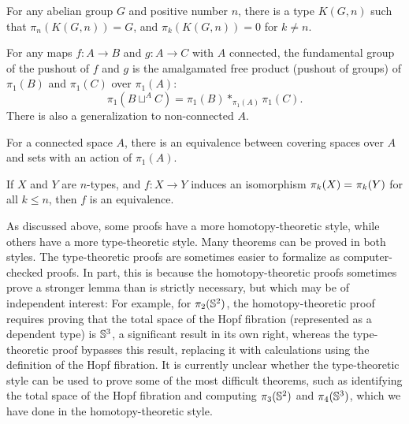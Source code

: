 \begin{thm}\label{Eilenberg-Mac-Lane-Spaces}
For any abelian group $G$ and positive number $n$, there is a type
$K(G,n)$ such that $\pi_n(K(G,n)) = G$, and  $\pi_k(K(G,n)) = 0$
for $k\neq n$.
\end{thm}

\begin{thm}\label{van-Kampen}
For any maps $f:A\to B$ and $g:A\to C$ with $A$ connected, the fundamental group of the pushout of $f$ and $g$ is the amalgamated free product (pushout of groups) of $\pi_1(B)$ and $\pi_1(C)$ over $\pi_1(A)$:
\[ \pi_1(B\sqcup^A C) = \pi_1(B) *_{\pi_1(A)} \pi_1(C).\]
There is also a generalization to non-connected $A$.
\end{thm}

\begin{thm}\label{thm:covering-spaces}
  For a connected space $A$, there is an equivalence between covering spaces over $A$ and sets with an action of $\pi_1(A)$.
\end{thm}

\begin{thm}\label{Whitehead-for-truncated-types}
If $X$ and $Y$ are $n$-types, and $f : X \rightarrow Y$ induces an
isomorphism $\pi_k(X) =_{} \pi_k(Y)$ for all $k \le n$, then $f$ is an
equivalence.
\end{thm}

As discussed above, some proofs have a more homotopy-theoretic style,
while others have a more type-theoretic style.  Many theorems can be
proved in both styles.  The type-theoretic proofs are sometimes easier
to formalize as computer-checked proofs.  In part, this is because the
homotopy-theoretic proofs sometimes prove a stronger lemma than is strictly
necessary, but which may be of independent interest: For example, for
$\pi_2(\mathbb{S} ^2)$, the homotopy-theoretic proof requires proving that the
total space of the Hopf fibration (represented as a dependent type) is
$\mathbb{S} ^3$, a significant result in its own right, whereas the
type-theoretic proof bypasses this result, replacing it with
calculations using the definition of the Hopf fibration.  It is
currently unclear whether the type-theoretic style can be used to prove
some of the most difficult theorems, such as identifying the total space of the Hopf
fibration and computing $\pi_3(\mathbb{S} ^2)$ and $\pi_4(\mathbb{S} ^3)$, which we have done in
the homotopy-theoretic style.

